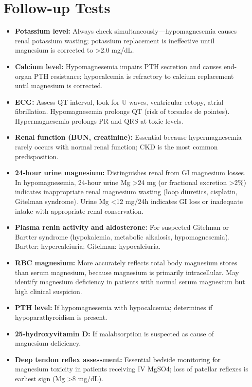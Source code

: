 \section*{Follow-up Tests}
\begin{itemize}
  \item \textbf{Potassium level:} Always check simultaneously---hypomagnesemia causes renal potassium wasting; potassium replacement is ineffective until magnesium is corrected to >2.0 mg/dL.
  \item \textbf{Calcium level:} Hypomagnesemia impairs PTH secretion and causes end-organ PTH resistance; hypocalcemia is refractory to calcium replacement until magnesium is corrected.
  \item \textbf{ECG:} Assess QT interval, look for U waves, ventricular ectopy, atrial fibrillation. Hypomagnesemia prolongs QT (risk of torsades de pointes). Hypermagnesemia prolongs PR and QRS at toxic levels.
  \item \textbf{Renal function (BUN, creatinine):} Essential because hypermagnesemia rarely occurs with normal renal function; CKD is the most common predisposition.
  \item \textbf{24-hour urine magnesium:} Distinguishes renal from GI magnesium losses. In hypomagnesemia, 24-hour urine Mg >24 mg (or fractional excretion >2\%) indicates inappropriate renal magnesium wasting (loop diuretics, cisplatin, Gitelman syndrome). Urine Mg <12 mg/24h indicates GI loss or inadequate intake with appropriate renal conservation.
  \item \textbf{Plasma renin activity and aldosterone:} For suspected Gitelman or Bartter syndrome (hypokalemia, metabolic alkalosis, hypomagnesemia). Bartter: hypercalciuria; Gitelman: hypocalciuria.
  \item \textbf{RBC magnesium:} More accurately reflects total body magnesium stores than serum magnesium, because magnesium is primarily intracellular. May identify magnesium deficiency in patients with normal serum magnesium but high clinical suspicion.
  \item \textbf{PTH level:} If hypomagnesemia with hypocalcemia; determines if hypoparathyroidism is present.
  \item \textbf{25-hydroxyvitamin D:} If malabsorption is suspected as cause of magnesium deficiency.
  \item \textbf{Deep tendon reflex assessment:} Essential bedside monitoring for magnesium toxicity in patients receiving IV MgSO4; loss of patellar reflexes is earliest sign (Mg >8 mg/dL).
\end{itemize}

